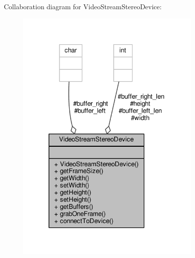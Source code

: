 Collaboration diagram for Video\+Stream\+Stereo\+Device\+:
\nopagebreak
\begin{figure}[H]
\begin{center}
\leavevmode
\includegraphics[width=260pt]{classVideoStreamStereoDevice__coll__graph}
\end{center}
\end{figure}
